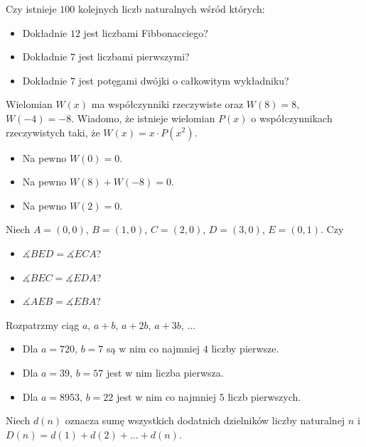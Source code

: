 \documentclass[12pt, a4paper]{article}
\newcommand{\question}[1]{\normalitem \begin{samepage}#1 \end{samepage}}
\newcommand{\questionwithasterix}[1]{ \asterixitem \begin{samepage}#1 \vspace{6cm}\end{samepage}}
\newcommand{\cmark}{\textcolor{green}{T}}%
\newcommand{\xmark}{\textcolor{red}{N}}%
\newcommand{\yes}{\rlap{\framebox(15,15)} {\raisebox{2pt}{\large\hspace{-1pt}\cmark}}%
\hspace{3pt}}
\newcommand{\no}{\rlap{\framebox(15,15)} {\raisebox{2pt}{\large\hspace{-1pt}\xmark}}%
\hspace{3pt}}
\begin{document}
\begin{enumerate}
    \question {
		Czy istnieje $100$ kolejnych liczb naturalnych wśród których:
	
		\begin{itemize}
			\item [\no]Dokładnie $12$ jest liczbami Fibbonacciego?
			\item [\yes]Dokładnie $7$ jest liczbami pierwszymi?
			\item [\yes]Dokładnie $7$ jest potęgami dwójki o całkowitym wykładniku?
		\end{itemize}
		
	}
	
	\questionwithasterix {
		Wielomian $W(x)$ ma współczynniki rzeczywiste oraz $W(8) = 8$, $W(-4) = -8$. Wiadomo, że istnieje wielomian $P(x)$ o współczynnikach rzeczywistych taki, że $W(x) = x \cdot P(x^2)$.
	
		\begin{itemize}
			\item [\yes]Na pewno $W(0) = 0$.
			\item [\yes]Na pewno $W(8) + W(-8) = 0$.
			\item [\no]Na pewno $W(2) = 0$.
		\end{itemize}
	}
	
	\questionwithasterix{
		Niech $A=(0,0)$, $B=(1,0)$, $C=(2,0)$, $D=(3,0)$, $E=(0,1)$. Czy
	
		\begin{itemize}
			\item [\yes]$\measuredangle BED = \measuredangle ECA$?
			\item [\yes]$\measuredangle BEC = \measuredangle EDA$?
			\item [\yes]$\measuredangle AEB = \measuredangle EBA$?
		\end{itemize}
	}
	
	\question{
		Rozpatrzmy ciąg $a$, $a+b$, $a+2b$, $a+3b$, $\ldots$
	
		\begin{itemize}
			\item [\yes]Dla $a=720$, $b=7$ są w nim co najmniej $4$ liczby pierwsze.
			\item [\no]Dla $a=39$, $b=57$ jest w nim liczba pierwsza.
			\item [\yes]Dla $a=8953$, $b=22$ jest w nim co najmniej $5$ liczb pierwszych.
		\end{itemize}
	}
	
	\question{
		Niech $d(n)$ oznacza sumę wszystkich dodatnich dzielników liczby naturalnej $n$ i $D(n) = d(1) + d(2) + \ldots + d(n)$.
	
}
\end{enumerate}
\end{document}
